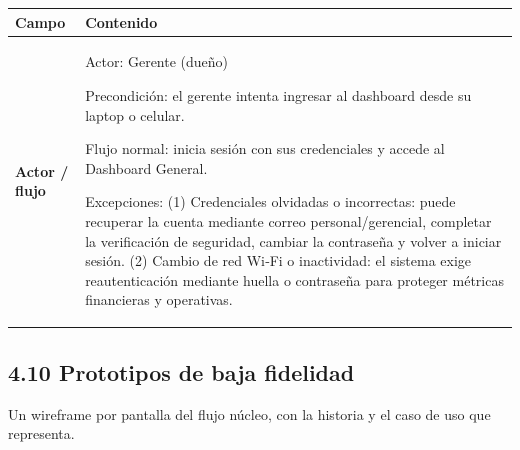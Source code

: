 {\def\LTcaptype{none} %
\begin{longtable}[]{@{}
  >{\raggedright\arraybackslash}p{}
  >{\raggedright\arraybackslash}p{}@{}}
\toprule\noalign{}
\begin{minipage}[b]{\linewidth}\raggedright
\textbf{Campo}
\end{minipage} & \begin{minipage}[b]{\linewidth}\raggedright
\textbf{Contenido}
\end{minipage} \\
\midrule\noalign{}
\endhead
\bottomrule\noalign{}
\endlastfoot
\textbf{Actor / flujo} & Actor: Gerente (dueño)

Precondición: el gerente intenta ingresar al dashboard desde su laptop o
celular.

Flujo normal: inicia sesión con sus credenciales y accede al Dashboard
General.

Excepciones: (1) Credenciales olvidadas o incorrectas: puede recuperar
la cuenta mediante correo personal/gerencial, completar la verificación
de seguridad, cambiar la contraseña y volver a iniciar sesión. (2)
Cambio de red Wi‑Fi o inactividad: el sistema exige reautenticación
mediante huella o contraseña para proteger métricas financieras y
operativas. \\
\end{longtable}
}

\subsection{4.10 Prototipos de baja
fidelidad}\label{prototipos-de-baja-fidelidad}

Un wireframe por pantalla del flujo núcleo, con la historia y el caso de uso que representa.




